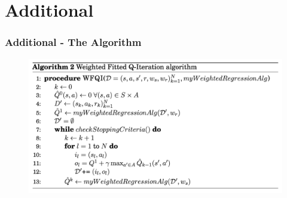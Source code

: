 \documentclass[professionalfont]{beamer}
\begin{document}
    \section{Additional}
    \begin{frame}
      \pause
      \frametitle{Additional - The Algorithm}
      \begin{figure}
        \includegraphics[scale=0.45]{images/wfqi.png}
      \end{figure}
    \end{frame}
\end{document}
